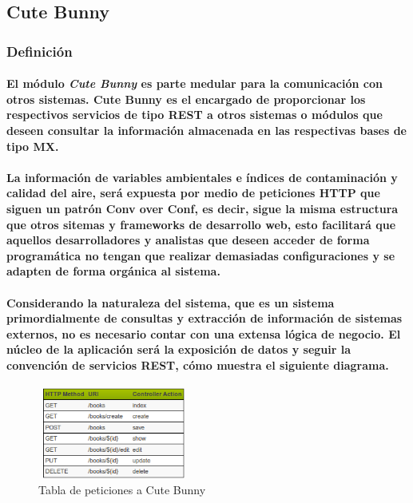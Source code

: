   \subsection{Cute Bunny}
    \subsubsection{Definición}
     \paragraph{El módulo \textbf{\emph{Cute Bunny}} es parte medular para la comunicación con otros sistemas. Cute Bunny es el encargado de proporcionar los respectivos servicios de tipo REST a otros sistemas o módulos que deseen consultar la información almacenada en las respectivas bases de tipo MX.}
     \paragraph{La información de variables ambientales e índices de contaminación y calidad del aire, será expuesta por medio de peticiones HTTP que siguen un patrón Conv over Conf, es decir, sigue la misma estructura que otros sitemas y frameworks de desarrollo web, esto facilitará que aquellos desarrolladores y analistas que deseen acceder de forma programática no tengan que realizar demasiadas configuraciones y se adapten de forma orgánica al sistema.}
     \paragraph{Considerando la naturaleza del sistema, que es un sistema primordialmente de consultas y extracción de información de sistemas externos, no es necesario contar con una extensa lógica de negocio. El núcleo de la aplicación será la exposición de datos y seguir la convención de servicios REST, cómo muestra el siguiente diagrama.}
      \begin{figure}[h!]
        \centering
        \includegraphics[width=5cm,height=3cm]{./images/DiagramaREST.png}
        \caption{Tabla de peticiones a Cute Bunny}
     \end{figure}
